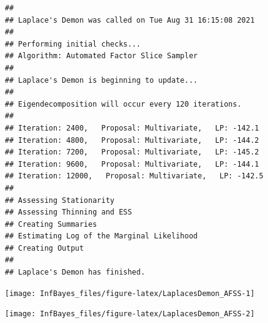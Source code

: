 \documentclass[
]{book}
\newenvironment{Shaded}{\begin{snugshade}}{\end{snugshade}}
\newcommand{\AttributeTok}[1]{\textcolor[rgb]{0.77,0.63,0.00}{#1}}
\newcommand{\ConstantTok}[1]{\textcolor[rgb]{0.00,0.00,0.00}{#1}}
\newcommand{\DecValTok}[1]{\textcolor[rgb]{0.00,0.00,0.81}{#1}}
\newcommand{\FunctionTok}[1]{\textcolor[rgb]{0.00,0.00,0.00}{#1}}
\newcommand{\NormalTok}[1]{#1}
\newcommand{\OtherTok}[1]{\textcolor[rgb]{0.56,0.35,0.01}{#1}}
\newcommand{\SpecialCharTok}[1]{\textcolor[rgb]{0.00,0.00,0.00}{#1}}
\newcommand{\StringTok}[1]{\textcolor[rgb]{0.31,0.60,0.02}{#1}}
\begin{document}
\begin{verbatim}
## 
## Laplace's Demon was called on Tue Aug 31 16:15:08 2021
## 
## Performing initial checks...
## Algorithm: Automated Factor Slice Sampler 
## 
## Laplace's Demon is beginning to update...
## 
## Eigendecomposition will occur every 120 iterations.
## 
## Iteration: 2400,   Proposal: Multivariate,   LP: -142.1
## Iteration: 4800,   Proposal: Multivariate,   LP: -144.2
## Iteration: 7200,   Proposal: Multivariate,   LP: -145.2
## Iteration: 9600,   Proposal: Multivariate,   LP: -144.1
## Iteration: 12000,   Proposal: Multivariate,   LP: -142.5
## 
## Assessing Stationarity
## Assessing Thinning and ESS
## Creating Summaries
## Estimating Log of the Marginal Likelihood
## Creating Output
## 
## Laplace's Demon has finished.
\end{verbatim}

\begin{Shaded}
\end{Shaded}

\begin{center}\texttt{[image: InfBayes\_files/figure-latex/LaplacesDemon\_AFSS-1]} \end{center}

\begin{center}\texttt{[image: InfBayes\_files/figure-latex/LaplacesDemon\_AFSS-2]} \end{center}
\end{document}
